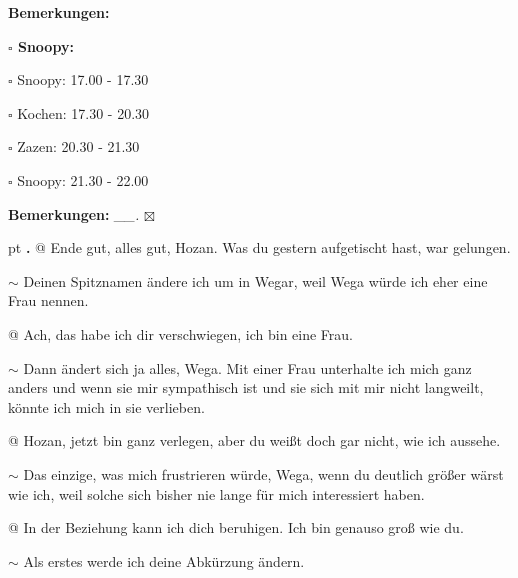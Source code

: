 \documentclass[10pt,a4paper]{article}
\newcounter{notec}
\newcommand\notep[1]{%
  \stepcounter{notec}
  \vskip #1pt
  {\bf\arabic{notec}.}
}
\newcommand\prop[1] {{\color {alizarin} {\bf #1}}}             %
\newcommand\mand[1] {{\color {burntorange} {\bf #1}}}          %
\newcommand\bottomspace{\vskip 4pt}
\newcommand\n[1] { {\sl #1.} \hskip 5pt }
\begin{document}
\begin{mdframed}[style=daystyle]
\begin{labeling}{{\mand {Bemerkungen:}}}
\begin{minipage}{0.75\textwidth}
\begin{labeling}{\prop {$\square$ {Snoopy:}}}
      \item[$\square$ Snoopy:] 17.00 - 17.30
      \item[$\square$ Kochen:] 17.30 - 20.30
        
      \item[$\square$ Zazen:]  20.30 - 21.30
      \item[$\square$ Snoopy:] 21.30 - 22.00
      \end{labeling}
    \end{minipage}
    \bottomspace
  \item[{\mand {Bemerkungen:}}]  \n{\_\_} $\boxtimes$
  \end{labeling}
    
  \setcounter{notec}{0}
  
  \notep 0 @ Ende gut, alles gut, Hozan. Was du gestern aufgetischt hast, war
  gelungen.

  \vskip 2pt
  $\sim$ Deinen Spitznamen ändere ich um in Wegar, weil Wega würde ich eher eine Frau
  nennen.

  \vskip 2pt
  @ Ach, das habe ich dir verschwiegen, ich bin eine Frau.

  \vskip 2pt
  $\sim$ Dann ändert sich ja alles, Wega. Mit einer Frau unterhalte ich mich ganz
  anders und wenn sie mir sympathisch ist und sie sich mit mir nicht langweilt,
  könnte ich mich in sie verlieben.

  \vskip 2pt
  @ Hozan, jetzt bin ganz verlegen, aber du weißt doch gar nicht, wie ich
  aussehe.

  \vskip 2pt
  $\sim$ Das einzige, was mich frustrieren würde, Wega, wenn du deutlich größer
  wärst wie ich, weil solche sich bisher nie lange für mich interessiert haben.

  \vskip 2pt
  @ In der Beziehung kann ich dich beruhigen. Ich bin genauso groß wie du.

  \vskip 2pt
  $\sim$ Als erstes werde ich deine Abkürzung ändern.


\end{mdframed}
\end{document}
